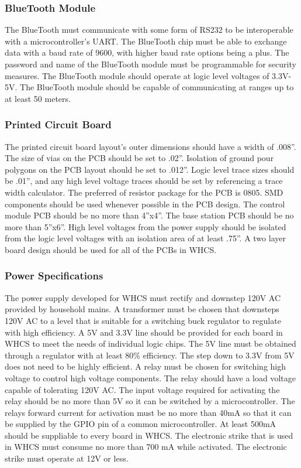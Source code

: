 \subsubsection{BlueTooth Module}

The BlueTooth must communicate with some form of RS232 to be interoperable with
a microcontroller{}'s UART. The BlueTooth chip must be able to exchange data
with a baud rate of 9600, with higher baud rate options being a plus. The
password and name of the BlueTooth module must be programmable for security
measures. The BlueTooth module should operate at logic level voltages of
3.3V{}-5V. The BlueTooth module should be capable of communicating at ranges up
to at least 50 meters.

\subsubsection{Printed Circuit Board}

The printed circuit board layout{}'s outer dimensions should have a width of
.008''. The size of vias on the PCB should be set to .02''. Isolation of ground
pour polygons on the PCB layout should be set to .012''. Logic level trace
sizes should be .01'', and any high level voltage traces should be set by
referencing a trace width calculator. The preferred of resistor package for the
PCB is 0805. SMD components should be used whenever possible in the PCB design.
The control module PCB should be no more than 4''x4''. The base station PCB
should be no more than 5''x6''. High level voltages from the power supply
should be isolated from the logic level voltages with an isolation area of at
least .75''. A two layer board design should be used for all of the PCBs in
WHCS.

\subsubsection{Power Specifications}

The power supply developed for WHCS must rectify and downstep 120V AC provided
by household mains. A transformer must be chosen that downsteps 120V AC to a
level that is suitable for a switching buck regulator to regulate with high
efficiency. A 5V and 3.3V line should be provided for each board in WHCS to
meet the needs of individual logic chips.  The 5V line must be obtained through
a regulator with at least 80\% efficiency. The step down to 3.3V from 5V does
not need to be highly efficient. A relay must be chosen for switching high
voltage to control high voltage components. The relay should have a load
voltage capable of tolerating 120V AC. The input voltage required for
activating the relay should be no more than 5V so it can be switched by a
microcontroller. The relays forward current for activation must be no more than
40mA so that it can be supplied by the GPIO pin of a common microcontroller. At
least 500mA should be suppliable to every board in WHCS. The electronic strike
that is used in WHCS must consume no more than 700 mA while activated. The
electronic strike must operate at 12V or less.

